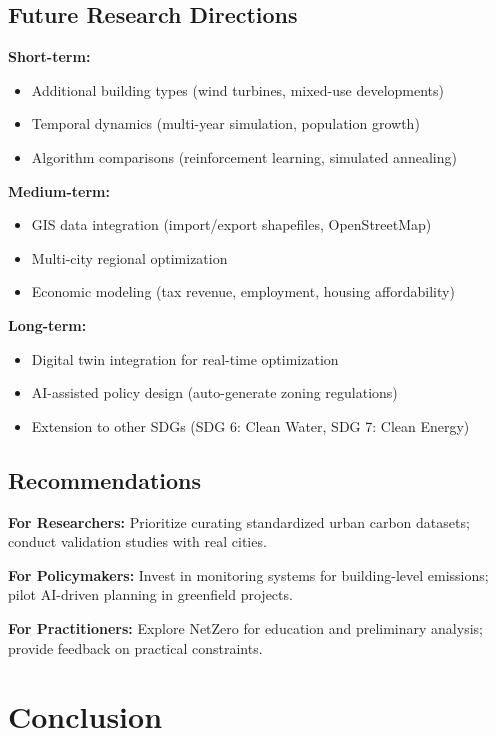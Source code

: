 \documentclass[conference]{IEEEtran}
\begin{document}
\subsection{Future Research Directions}

\textbf{Short-term:}
\begin{itemize}
    \item Additional building types (wind turbines, mixed-use developments)
    \item Temporal dynamics (multi-year simulation, population growth)
    \item Algorithm comparisons (reinforcement learning, simulated annealing)
\end{itemize}

\textbf{Medium-term:}
\begin{itemize}
    \item GIS data integration (import/export shapefiles, OpenStreetMap)
    \item Multi-city regional optimization
    \item Economic modeling (tax revenue, employment, housing affordability)
\end{itemize}

\textbf{Long-term:}
\begin{itemize}
    \item Digital twin integration for real-time optimization
    \item AI-assisted policy design (auto-generate zoning regulations)
    \item Extension to other SDGs (SDG 6: Clean Water, SDG 7: Clean Energy)
\end{itemize}

\subsection{Recommendations}

\textbf{For Researchers:} Prioritize curating standardized urban carbon datasets; conduct validation studies with real cities.

\textbf{For Policymakers:} Invest in monitoring systems for building-level emissions; pilot AI-driven planning in greenfield projects.

\textbf{For Practitioners:} Explore NetZero for education and preliminary analysis; provide feedback on practical constraints.

\section{Conclusion}
\end{document}
